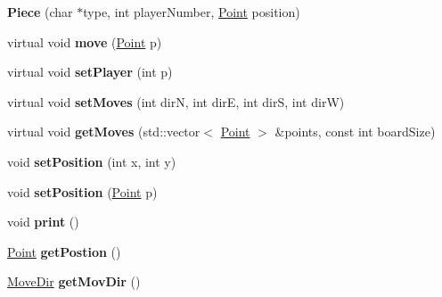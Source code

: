 \begin{DoxyCompactItemize}
\item 
\hypertarget{class_piece_af20b3f54c1dfafe3aac36bac2a0cafaf}{{\bfseries Piece} (char $\ast$type, int player\-Number, \hyperlink{struct_point}{Point} position)}\label{class_piece_af20b3f54c1dfafe3aac36bac2a0cafaf}

\item 
\hypertarget{class_piece_af0360ba66c38dc5f35b0de53653c0136}{virtual void {\bfseries move} (\hyperlink{struct_point}{Point} p)}\label{class_piece_af0360ba66c38dc5f35b0de53653c0136}

\item 
\hypertarget{class_piece_a84ba6ffb15c8e35be6a2eaa768a79d8c}{virtual void {\bfseries set\-Player} (int p)}\label{class_piece_a84ba6ffb15c8e35be6a2eaa768a79d8c}

\item 
\hypertarget{class_piece_aed124504a141b5920baf6919d7aa07a1}{virtual void {\bfseries set\-Moves} (int dir\-N, int dir\-E, int dir\-S, int dir\-W)}\label{class_piece_aed124504a141b5920baf6919d7aa07a1}

\item 
\hypertarget{class_piece_a24d8dbf44002666b0cdbc82c3fe689c3}{virtual void {\bfseries get\-Moves} (std\-::vector$<$ \hyperlink{struct_point}{Point} $>$ \&points, const int board\-Size)}\label{class_piece_a24d8dbf44002666b0cdbc82c3fe689c3}

\item 
\hypertarget{class_piece_a72665a008584e735f6c04ce91038c7e4}{void {\bfseries set\-Position} (int x, int y)}\label{class_piece_a72665a008584e735f6c04ce91038c7e4}

\item 
\hypertarget{class_piece_a016d7fe7de3eda5e10ea1a0bda8900e8}{void {\bfseries set\-Position} (\hyperlink{struct_point}{Point} p)}\label{class_piece_a016d7fe7de3eda5e10ea1a0bda8900e8}

\item 
\hypertarget{class_piece_a6f756ed0481304973757272233addbd4}{void {\bfseries print} ()}\label{class_piece_a6f756ed0481304973757272233addbd4}

\item 
\hypertarget{class_piece_ab011e4ae76a47c8f5a57fed6ed3bc40c}{\hyperlink{struct_point}{Point} {\bfseries get\-Postion} ()}\label{class_piece_ab011e4ae76a47c8f5a57fed6ed3bc40c}

\item 
\hypertarget{class_piece_ae3ab3d26428b104eea1ef049c0b65f3a}{\hyperlink{struct_move_dir}{Move\-Dir} {\bfseries get\-Mov\-Dir} ()}\label{class_piece_ae3ab3d26428b104eea1ef049c0b65f3a}


\end{DoxyCompactItemize}
